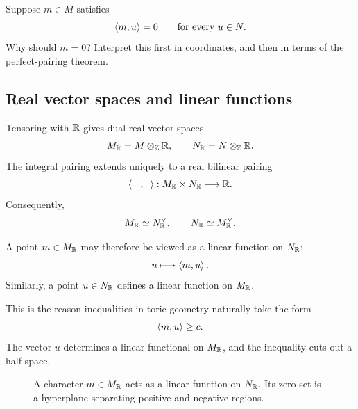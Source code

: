 \begin{pauseandthink}
Suppose \(m\in M\) satisfies
\[
\left\langle m,u\right\rangle=0
\qquad
\text{for every }u\in N.
\]
Why should \(m=0\)? Interpret this first in coordinates, and then in
terms of the perfect-pairing theorem.
\end{pauseandthink}

\subsection{Real vector spaces and linear functions}

Tensoring with \(\mathbb{R}\) gives dual real vector spaces
\[
M_{\mathbb{R}}=M\otimes_{\mathbb{Z}}\mathbb{R},
\qquad
N_{\mathbb{R}}=N\otimes_{\mathbb{Z}}\mathbb{R}.
\]
The integral pairing extends uniquely to a real bilinear pairing
\[
\left\langle \phantom{m},\phantom{u}\right\rangle:
M_{\mathbb{R}}\times N_{\mathbb{R}}\longrightarrow\mathbb{R}.
\]
Consequently,
\[
M_{\mathbb{R}}\simeq N_{\mathbb{R}}^{\vee},
\qquad
N_{\mathbb{R}}\simeq M_{\mathbb{R}}^{\vee}.
\]

A point \(m\in M_{\mathbb{R}}\) may therefore be viewed as a linear function
on \(N_{\mathbb{R}}\):
\[
u\longmapsto\left\langle m,u\right\rangle.
\]
Similarly, a point \(u\in N_{\mathbb{R}}\) defines a linear function on
\(M_{\mathbb{R}}\).

This is the reason inequalities in toric geometry naturally take the
form
\[
\left\langle m,u\right\rangle\geq c.
\]
The vector \(u\) determines a linear functional on \(M_{\mathbb{R}}\), and
the inequality cuts out a half-space.

\begin{figure}[ht]
\centering
{}
\caption{A character \(m\in M_{\mathbb{R}}\) acts as a linear function on
\(N_{\mathbb{R}}\). Its zero set is a hyperplane separating positive and
negative regions.}
\label{fig:character-linear-functional-on-N}
\end{figure}

